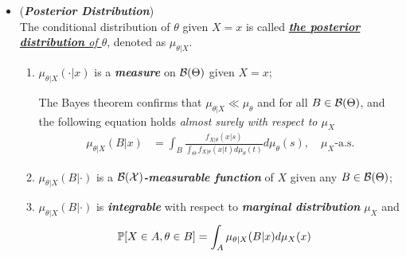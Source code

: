 \documentclass[11pt]{article}
\begin{document}
\begin{itemize}
\item \begin{definition}  (\emph{\textbf{Posterior Distribution}}) \citep{schervish2012theory}\\
The conditional distribution of $\theta$ given $X = x$ is called \underline{\emph{\textbf{the posterior distribution} of $\theta$}}, denoted as $\mu_{\theta | X}$.
\begin{enumerate}
\item $\mu_{\theta | X}(\cdot | x)$ is a \emph{\textbf{measure}} on ${\mathcal B}(\Theta)$ given $X = x$; 

The Bayes theorem confirms that $\mu_{\theta | X} \ll \mu_{\theta}$ and for all $B \in {\mathcal B}(\Theta)$, and the following equation holds \emph{almost surely with respect to $\mu_X$}
\begin{align}
\mu_{\theta | X}(B|x) &= \int_{B}\frac{ f_{X|\theta}(x|s) }{ \int_{\Theta} f_{X|\theta}(x|t)d\mu_{\theta}(t)}d\mu_{\theta}(s), \quad \mu_X\text{-a.s.}  \label{eqn: posterior_measure}
\end{align}

\item $\mu_{\theta | X}(B|\cdot)$ is a \emph{\textbf{${\mathcal B}({\mathcal X})$-measurable function}} of $X$ given any $B \in {\mathcal B}(\Theta)$;

\item $\mu_{\theta | X}(B|\cdot)$ is \emph{\textbf{integrable}} with respect to \emph{\textbf{marginal distribution}} $\mu_{X}$ and 
\begin{align}
{\mathbb P}[X \in A,  \theta \in B] &= \int_{A}\mu_{\theta | X}(B | x) d\mu_{X}(x)    \label{eqn: posterior_joint}
\end{align}
\end{enumerate}
\end{definition}




\end{itemize}
\end{document}
